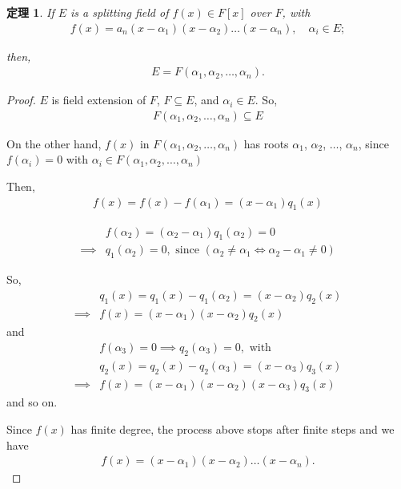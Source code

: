 \documentclass[utf8]{ctexbook}
\newtheorem{theorem}{定理}[section]
\begin{document}
\begin{theorem}
\label{theorem_4_4_1_orig_splitting_field_extension}
If $E$ is a splitting field of $f(x) \in F[x]$ over $F$, with
\begin{align*}
f(x) =  a_n (x-\alpha_1)(x-\alpha_2) \ldots (x-\alpha_n), 
\quad \alpha_i \in E ;
\end{align*}

then, 
\begin{align*}
E = F(\alpha_1, \alpha_2, \ldots, \alpha_n) .
\end{align*}
\end{theorem}

\begin{proof}
$E$ is field extension of $F$, $F\subseteq E$, and $\alpha_i \in E$. So,
\begin{align*}
F(\alpha_1, \alpha_2, \ldots, \alpha_n) \subseteq E
\end{align*}

On the other hand, $f(x)$ in $F(\alpha_1, \alpha_2, \ldots, \alpha_n) $ has roots $\alpha_1$, $\alpha_2$, $\ldots$, $\alpha_n$, since $f(\alpha_i) = 0$ with $\alpha_i \in F(\alpha_1, \alpha_2, \ldots, \alpha_n)$

Then,
\begin{align*}
f(x) = f(x) - f(\alpha_1) = (x- \alpha_1) q_1 (x)
\end{align*}

\begin{align*}
& f(\alpha_2) = (\alpha_2 - \alpha_1) q_1 (\alpha_2) = 0 \\
\implies & q_1 (\alpha_2) = 0, \mbox{  since }( \alpha_2 \neq \alpha_1 \iff \alpha_2 - \alpha_1 \neq 0)
\end{align*}

So,
\begin{align*}
& q_1 (x) = q_1 (x) - q_1 (\alpha_2) = (x-\alpha_2) q_2 (x) \\
\implies & f(x) = (x- \alpha_1) (x-\alpha_2) q_2 (x) 
\end{align*}
and 
\begin{align*}
& f(\alpha_3) = 0 \implies q_2 (\alpha_3) =0, \mbox{ with } \\
& q_2 (x) = q_2 (x) - q_2 (\alpha_3) = (x - \alpha_3) q_3 (x) \\
\implies & f(x) = (x- \alpha_1) (x-\alpha_2) (x-\alpha_3) q_3 (x)
\end{align*}
and so on.

Since $f(x)$ has finite degree, the process above stops after finite steps and we have
\begin{align*}
f(x) =  (x- \alpha_1) (x-\alpha_2) \ldots (x-\alpha_n) .
\end{align*}


\end{proof}
\end{document}
